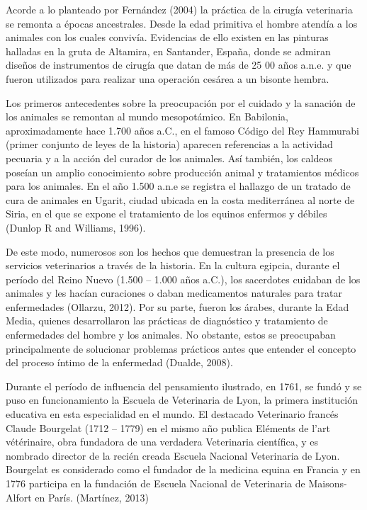 Acorde a lo planteado por Fernández (2004) la práctica de la cirugía veterinaria se remonta a épocas ancestrales. Desde la edad primitiva el hombre atendía a los animales con los cuales convivía. Evidencias de ello existen en las pinturas halladas en la gruta de Altamira, en Santander, España, donde se admiran diseños de instrumentos de cirugía que datan de más de 25 00 años a.n.e. y que fueron utilizados para realizar una operación cesárea a un bisonte hembra.   

Los primeros antecedentes sobre la preocupación por el cuidado y la sanación de los animales se remontan al mundo mesopotámico. En Babilonia, aproximadamente hace 1.700 años a.C., en el famoso Código del Rey Hammurabi (primer conjunto de leyes de la historia) aparecen referencias a la actividad pecuaria y a la acción del curador de los animales. Así también, los caldeos poseían un amplio conocimiento sobre producción animal y tratamientos médicos para los animales. En el año 1.500 a.n.e se registra el hallazgo de un tratado de cura de animales en Ugarit, ciudad ubicada en la costa mediterránea al norte de Siria, en el que se expone el tratamiento de los equinos enfermos y débiles (Dunlop R and Williams, 1996). 

De este modo, numerosos son los hechos que demuestran la presencia de los servicios veterinarios a través de la historia. En la cultura egipcia, durante el período del Reino Nuevo (1.500 – 1.000 años a.C.), los sacerdotes cuidaban de los animales y les hacían curaciones o daban medicamentos naturales para tratar enfermedades (Ollarzu, 2012). Por su parte, fueron los árabes, durante la Edad Media, quienes desarrollaron las prácticas de diagnóstico y tratamiento de enfermedades del hombre y los animales. No obstante, estos se preocupaban principalmente de solucionar problemas prácticos antes que entender el concepto del proceso íntimo de la enfermedad (Dualde, 2008).  

Durante el período de influencia del pensamiento ilustrado, en 1761, se fundó y se puso en funcionamiento la Escuela de Veterinaria de Lyon, la primera institución educativa en esta especialidad en el mundo. El destacado Veterinario francés Claude Bourgelat (1712 – 1779) en el mismo año publica Eléments de l’art vétérinaire, obra fundadora de una verdadera Veterinaria científica, y es nombrado director de la recién creada Escuela Nacional Veterinaria de Lyon. Bourgelat es considerado como el fundador de la medicina equina en Francia y en 1776 participa en la fundación de Escuela Nacional de Veterinaria de Maisons-Alfort en París. (Martínez, 2013) 

